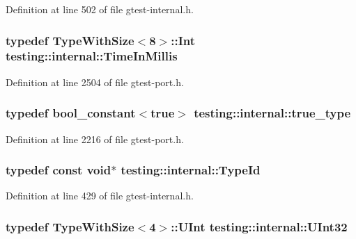 Definition at line 502 of file gtest-\/internal.\+h.

\subsubsection[{\texorpdfstring{Time\+In\+Millis}{TimeInMillis}}]{\setlength{\rightskip}{0pt plus 5cm}typedef {\bf Type\+With\+Size}$<$8$>$\+::Int {\bf testing\+::internal\+::\+Time\+In\+Millis}}\hypertarget{namespacetesting_1_1internal_a66a845df404b38fe85c5e14a069f255a}{}\label{namespacetesting_1_1internal_a66a845df404b38fe85c5e14a069f255a}


Definition at line 2504 of file gtest-\/port.\+h.

\subsubsection[{\texorpdfstring{true\+\_\+type}{true_type}}]{\setlength{\rightskip}{0pt plus 5cm}typedef {\bf bool\+\_\+constant}$<$true$>$ {\bf testing\+::internal\+::true\+\_\+type}}\hypertarget{namespacetesting_1_1internal_a62f917c3424d8841de9b49b5ec28edb4}{}\label{namespacetesting_1_1internal_a62f917c3424d8841de9b49b5ec28edb4}


Definition at line 2216 of file gtest-\/port.\+h.

\subsubsection[{\texorpdfstring{Type\+Id}{TypeId}}]{\setlength{\rightskip}{0pt plus 5cm}typedef const void$\ast$ {\bf testing\+::internal\+::\+Type\+Id}}\hypertarget{namespacetesting_1_1internal_ab1114197d3c657d8b7f8e0c5caa12d00}{}\label{namespacetesting_1_1internal_ab1114197d3c657d8b7f8e0c5caa12d00}


Definition at line 429 of file gtest-\/internal.\+h.

\subsubsection[{\texorpdfstring{U\+Int32}{UInt32}}]{\setlength{\rightskip}{0pt plus 5cm}typedef {\bf Type\+With\+Size}$<$4$>$\+::U\+Int {\bf testing\+::internal\+::\+U\+Int32}}\hypertarget{namespacetesting_1_1internal_a40d4fffcd2bf56f18b1c380615aa85e3}{}\label{namespacetesting_1_1internal_a40d4fffcd2bf56f18b1c380615aa85e3}


